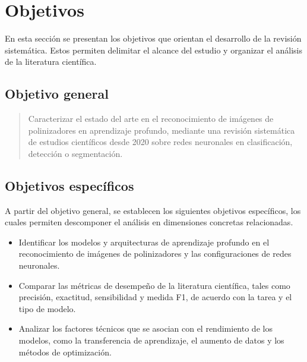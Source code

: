 \chapter{Objetivos}

En esta sección se presentan los objetivos que orientan el desarrollo de la revisión sistemática. Estos permiten delimitar el alcance del estudio y organizar el análisis de la literatura científica.


\section{Objetivo general}

\begin{quote}
    Caracterizar el estado del arte en el reconocimiento de imágenes de polinizadores en aprendizaje profundo, mediante una revisión sistemática de estudios científicos desde 2020 sobre redes neuronales en clasificación, detección o segmentación.
\end{quote}


\section{Objetivos específicos}

A partir del objetivo general, se establecen los siguientes objetivos específicos, los cuales permiten descomponer el análisis en dimensiones concretas relacionadas.

\begin{itemize}
  \item Identificar los modelos y arquitecturas de aprendizaje profundo en el reconocimiento de imágenes de polinizadores y las configuraciones de redes neuronales.
  \item Comparar las métricas de desempeño de la literatura científica, tales como precisión, exactitud, sensibilidad y medida F1, de acuerdo con la tarea y el tipo de modelo.
  \item Analizar los factores técnicos que se asocian con el rendimiento de los modelos, como la transferencia de aprendizaje, el aumento de datos y los métodos de optimización.
\end{itemize}